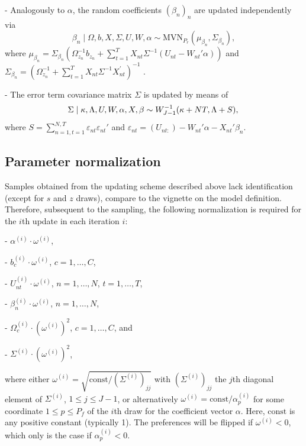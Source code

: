\documentclass[article]{jss}
\begin{document}
- Analogously to $\alpha$, the random coefficients $(\beta_n)_n$ are updated independently via
\begin{equation}
\beta_n \mid \Omega,b,X,\Sigma,U,W,\alpha \sim \text{MVN}_{P_r}(\mu_{\beta_n},\Sigma_{\beta_n}),
\end{equation}
where $\mu_{\beta_n} = \Sigma_{\beta_n} (\Omega_{z_n}^{-1}b_{z_n} + \sum_{t=1}^{T} X_{nt} \Sigma^{-1} (U_{nt}-W_{nt}'\alpha) )$ and $\Sigma_{\beta_n} = (\Omega_{z_n}^{-1} + \sum_{t=1}^{T} X_{nt}\Sigma^{-1} X_{nt}^{'} )^{-1}$ .

- The error term covariance matrix $\Sigma$ is updated by means of
\begin{equation}
\Sigma \mid \kappa,\Lambda,U,W,\alpha,X,\beta \sim W^{-1}_{J-1}(\kappa+NT,\Lambda+S), \\
\end{equation}
where $S = \sum_{n=1,t=1}^{N,T} \varepsilon_{nt} \varepsilon_{nt}'$ and $\varepsilon_{nt} = (U_{nt:}) - W_{nt}'\alpha - X_{nt}'\beta_n$.

\subsection{Parameter normalization} \label{subsec:parameter_normalization}

Samples obtained from the updating scheme described above lack identification (except for $s$ and $z$ draws), compare to the vignette on the model definition. Therefore, subsequent to the sampling, the following normalization is required for the $i$th update in each iteration $i$:

- $\alpha^{(i)} \cdot \omega^{(i)}$,

- $b_c^{(i)} \cdot \omega^{(i)}$, $c=1,\dots,C$,

- $U_{nt}^{(i)} \cdot \omega^{(i)}$, $n = 1,\dots,N$, $t = 1,\dots,T$,

- $\beta_n^{(i)} \cdot \omega^{(i)}$, $n = 1,\dots,N$,

- $\Omega_c^{(i)} \cdot (\omega^{(i)})^2$, $c=1,\dots,C$, and

- $\Sigma^{(i)} \cdot (\omega^{(i)})^2$,

where either $\omega^{(i)} = \sqrt{\text{const} / (\Sigma^{(i)})_{jj}}$ with $(\Sigma^{(i)})_{jj}$ the $j$th diagonal element of $\Sigma^{(i)}$, $1\leq j \leq J-1$, or alternatively $\omega^{(i)} = \text{const} / \alpha^{(i)}_p$ for some coordinate $1\leq p \leq P_f$ of the $i$th draw for the coefficient vector $\alpha$. Here, $\text{const}$ is any positive constant (typically 1). The preferences will be flipped if $\omega^{(i)} < 0$, which only is the case if $\alpha^{(i)}_p < 0$.
\end{document}
